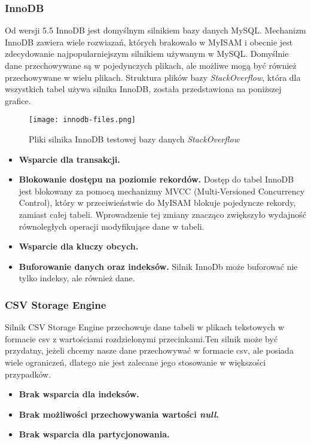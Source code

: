 \subsubsection{InnoDB}
Od wersji 5.5 InnoDB jest domyślnym silnikiem bazy danych MySQL. Mechanizm InnoDB zawiera wiele rozwiazań, których brakowało w MyISAM i obecnie jest zdecydowanie najpopularniejszym silnikiem używanym w MySQL. Domyślnie dane przechowywane są w pojedynczych plikach, ale możliwe mogą być również przechowywane w wielu plikach. Struktura plików bazy \textit{StackOverflow}, która dla wszystkich tabel używa silnika InnoDB, została przedstawiona na poniższej grafice. 
\begin{figure}[!h]
	\caption{Pliki silnika InnoDB testowej bazy danych \textit{StackOverflow}}
	\centering
	\texttt{[image: innodb-files.png]}
	\label{fig:label}
\end{figure}

\begin{itemize}
	\item \textbf{Wsparcie dla transakcji. }
	\item \textbf{Blokowanie dostępu na poziomie rekordów. } Dostęp do tabel InnoDB jest blokowany za pomocą mechanizmy MVCC (Multi-Versioned Concurrency Control), który w przeciwieństwie do MyISAM blokuje pojedyncze rekordy, zamiast całej tabeli. Wprowadzenie tej zmiany znacząco zwiększyło wydajność równoległych operacji modyfikujące dane w tabeli.
	\item \textbf{Wsparcie dla kluczy obcych.}
	\item \textbf{Buforowanie danych oraz indeksów.} Silnik InnoDb może buforować nie tylko indeksy, ale również dane.
\end{itemize}

\subsubsection{CSV Storage Engine}
Silnik CSV Storage Engine przechowuje dane tabeli w plikach tekstowych w formacie csv z wartościami rozdzielonymi przecinkami.Ten silnik może być przydatny, jeżeli chcemy nasze dane przechowywać w formacie csv, ale posiada wiele ograniczeń, dlatego nie jest zalecane jego stosowanie w większości przypadków.

\begin{itemize}
	\item \textbf{Brak wsparcia dla indeksów.}
	\item \textbf{Brak możliwości przechowywania wartości \textit{null}.}
	\item \textbf{Brak wsparcia dla partycjonowania.}
\end{itemize}

